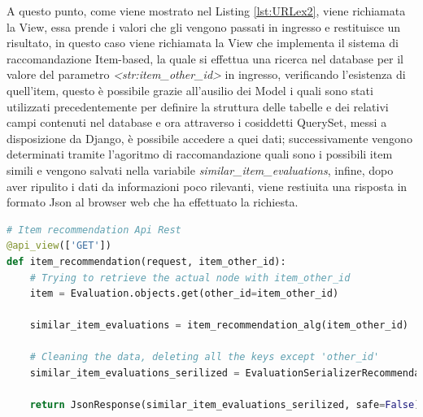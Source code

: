 A questo punto, come viene mostrato nel Listing \ref{lst:URLex2}, viene richiamata la View, essa prende i valori che gli vengono passati in ingresso e 
restituisce un risultato, in questo caso viene richiamata la View che implementa il sistema di raccomandazione Item-based, la quale si effettua una ricerca 
nel database per il valore del parametro \textit{<str:item\_other\_id>} in ingresso, verificando l'esistenza di quell'item, questo è possibile
grazie all'ausilio dei Model i quali sono stati utilizzati precedentemente per definire la struttura delle tabelle e dei relativi campi 
contenuti nel database e ora attraverso i cosiddetti QuerySet, messi a disposizione da Django, è possibile accedere a quei dati; successivamente vengono 
determinati tramite l'agoritmo di raccomandazione quali sono i possibili item simili e vengono salvati nella variabile \textit{similar\_item\_evaluations}, 
infine, dopo aver ripulito i dati da informazioni poco rilevanti, viene restiuita una risposta in formato Json al browser web che ha effettuato la richiesta.
\lstset{style=python_code_style}
\begin{lstlisting}[language=Python, label=lst:URLex2]
# Item recommendation Api Rest
@api_view(['GET'])
def item_recommendation(request, item_other_id):
    # Trying to retrieve the actual node with item_other_id
    item = Evaluation.objects.get(other_id=item_other_id)

    similar_item_evaluations = item_recommendation_alg(item_other_id)

    # Cleaning the data, deleting all the keys except 'other_id'
    similar_item_evaluations_serilized = EvaluationSerializerRecommendation(similar_item_evaluations, many=True).data

    return JsonResponse(similar_item_evaluations_serilized, safe=False)
\end{lstlisting}
%
